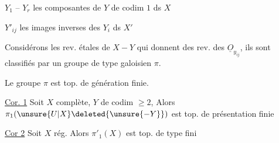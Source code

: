 
$Y_1$ -- $Y_r$ les composantes de $Y$ de codim $1$ ds $X$

$Y'_{ij}$ les images inverses des $Y_i$ ds $X'$

 Considérons les rev. étales de $X-Y$ qui
 donnent des rev.  des $\underline{O}_{y_{ij}}$,
ils sont classifiés par un groupe de type galoisien $\pi$.

\uline{} Le groupe $\pi$ est top. de génération finie.

\uline{Cor. 1} Soit $X$ complète, $Y$ de codim $\geq 2$,  Alors $\pi_1(\unsure{U|X}\deleted{\unsure{-Y}})$
est top. de présentation finie

\uline{Cor 2} Soit $X$  rég. Alors $\pi'_1(X)$ est top. de
type fini
